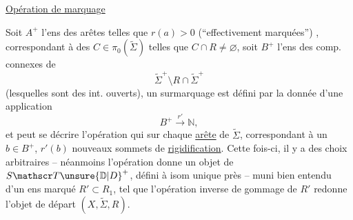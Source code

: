  \uline{Opération de marquage}


Soit $A^+$ l'ens des arêtes   telles que $r(a)>0$ (``effectivement marquées'') , correspondant à des $C\in\pi_0(\widetilde\Sigma)$ telles que $C\cap R\ne\varnothing$, soit $B^+$ l'ens des comp. connexes de
\[
\widetilde\Sigma^+\setminus R\cap\widetilde\Sigma^+
\]
(lesquelles sont des int. ouverts), un surmarquage est défini par la donnée d'une application
\[
B^+\xrightarrow{r'}\mathbb N,
\]
et peut se décrire  l'opération qui  sur chaque \uline{arête} de $\widetilde\Sigma$, correspondant à un $b\in B^+$, $r'(b)$ nouveaux sommets de \uline{rigidification}. Cette fois-ci,  il y a des choix arbitraires -- néanmoins l'opération donne un objet de $S\mathscr T\unsure{\mathbb D|D}^+$, défini à isom unique près --  muni bien entendu d'un ens marqué $R'\subset R_1$, tel que l'opération inverse de gommage de $R'$ redonne l'objet de départ $(X,\widetilde\Sigma,R)$.
